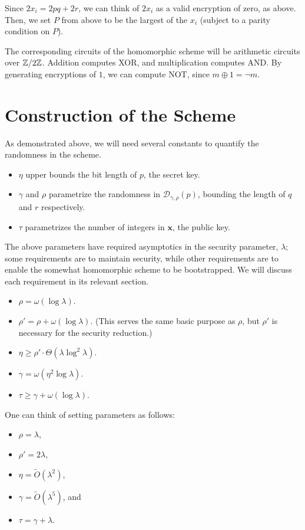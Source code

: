 Since $2 x_i = 2pq + 2r$, we can think of $2 x_i$ as a valid encryption of zero, as above. Then, we set $P$ from above to be the largest of the $x_i$ (subject to a parity condition on $P$).


The corresponding circuits of the homomorphic scheme will be arithmetic circuits over $\mathbb{Z} / 2\mathbb{Z}$. Addition computes XOR, and multiplication computes AND. By generating encryptions of $1$, we can compute NOT, since $m \oplus 1 = \neg m$.



\section{Construction of the Scheme}
\label{sec: dghvscheme}

As demonstrated above, we will need several constants to quantify the randomness in the scheme.
\begin{itemize}
\item $\eta$ upper bounds the bit length of $p$, the secret key.
\item $\gamma$ and $\rho$ parametrize the randomness in $\mathcal{D}_{\gamma, \rho}(p)$, bounding the length of $q$ and $r$ respectively.
\item $\tau$ parametrizes the number of integers in $\mathbf{x}$, the public key.
\end{itemize}

The above parameters have required asymptotics in the security parameter, $\lambda$; some requirements are to maintain security, while other requirements are to enable the somewhat homomorphic scheme to be bootstrapped. We will discuss each requirement in its relevant section.

\begin{itemize}
\item $\rho = \omega(\log \lambda)$.
\item $\rho' = \rho + \omega(\log \lambda)$. (This serves the same basic purpose as $\rho$, but $\rho'$ is necessary for the security reduction.)
\item $\eta \geq \rho' \cdot \Theta(\lambda \log^2 \lambda)$.
\item $\gamma = \omega(\eta^2 \log \lambda)$.
\item $\tau \geq \gamma + \omega(\log \lambda)$.
\end{itemize}

One can think of setting parameters as follows:
\begin{itemize}
    \item $\rho = \lambda$,
    \item $\rho' = 2\lambda$,
    \item $\eta = \widetilde{O}(\lambda^2)$,
    \item $\gamma = \widetilde{O}(\lambda^5)$, and
    \item $\tau = \gamma + \lambda$.
\end{itemize}

